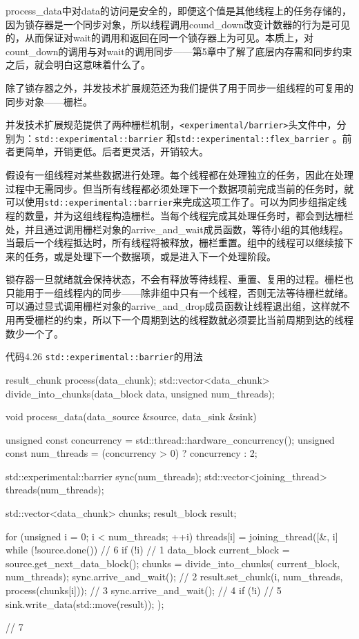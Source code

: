 process\_data中对data的访问是安全的，即便这个值是其他线程上的任务存储的，因为锁存器是一个同步对象，所以线程调用cound\_down改变计数器的行为是可见的，从而保证对wait的调用和返回在同一个锁存器上为可见。本质上，对count\_down的调用与对wait的调用同步——第5章中了解了底层内存需和同步约束之后，就会明白这意味着什么了。

除了锁存器之外，并发技术扩展规范还为我们提供了用于同步一组线程的可复用的同步对象——栅栏。


并发技术扩展规范提供了两种栅栏机制，\texttt{<experimental/barrier>}头文件中，分别为：\texttt{std::experimental::barrier} 和\texttt{std::experimental::flex\_barrier} 。前者更简单，开销更低。后者更灵活，开销较大。

假设有一组线程对某些数据进行处理。每个线程都在处理独立的任务，因此在处理过程中无需同步。但当所有线程都必须处理下一个数据项前完成当前的任务时，就可以使用\texttt{std::experimental::barrier}来完成这项工作了。可以为同步组指定线程的数量，并为这组线程构造栅栏。当每个线程完成其处理任务时，都会到达栅栏处，并且通过调用栅栏对象的arrive\_and\_wait成员函数，等待小组的其他线程。当最后一个线程抵达时，所有线程将被释放，栅栏重置。组中的线程可以继续接下来的任务，或是处理下一个数据项，或是进入下一个处理阶段。

锁存器一旦就绪就会保持状态，不会有释放等待线程、重置、复用的过程。栅栏也只能用于一组线程内的同步——除非组中只有一个线程，否则无法等待栅栏就绪。可以通过显式调用栅栏对象的arrive\_and\_drop成员函数让线程退出组，这样就不用再受栅栏的约束，所以下一个周期到达的线程数就必须要比当前周期到达的线程数少一个了。

代码4.26 \texttt{std::experimental::barrier}的用法

\begin{cpp}
result_chunk process(data_chunk);
std::vector<data_chunk>
divide_into_chunks(data_block data, unsigned num_threads);

void process_data(data_source &source, data_sink &sink) {
  unsigned const concurrency = std::thread::hardware_concurrency();
  unsigned const num_threads = (concurrency > 0) ? concurrency : 2;

  std::experimental::barrier sync(num_threads);
  std::vector<joining_thread> threads(num_threads);

  std::vector<data_chunk> chunks;
  result_block result;

  for (unsigned i = 0; i < num_threads; ++i) {
    threads[i] = joining_thread([&, i] {
      while (!source.done()) { // 6
        if (!i) { // 1
          data_block current_block =
            source.get_next_data_block();
            chunks = divide_into_chunks(
              current_block, num_threads);
        }
        sync.arrive_and_wait(); // 2
        result.set_chunk(i, num_threads, process(chunks[i])); // 3
        sync.arrive_and_wait(); // 4
        if (!i) { // 5
          sink.write_data(std::move(result));
        }
      }
    });
  }
} // 7
\end{cpp}

